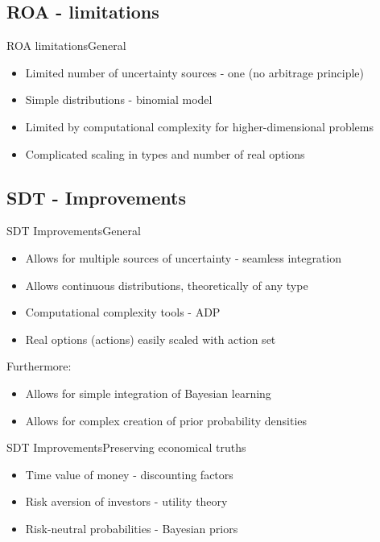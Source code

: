 \documentclass[us]{beamer}
\begin{document}
\subsection{ROA - limitations}

\begin{frame}{ROA limitations}{General}
	\begin{itemize}
		\item {Limited number of uncertainty sources - one (no arbitrage principle)}
		\item {Simple distributions - binomial model}
		\item {Limited by computational complexity for higher-dimensional problems}
		\item {Complicated scaling in types and number of real options}
	\end{itemize}
\end{frame}

\subsection{SDT - Improvements}

\begin{frame}{SDT Improvements}{General}
	\begin{itemize}
		\item {Allows for multiple sources of uncertainty - seamless integration}
		\item {Allows continuous distributions, theoretically of any type}
		\item {Computational complexity tools - ADP}
		\item {Real options (actions) easily scaled with action set}
	\end{itemize}

	Furthermore: 
	\begin{itemize}
		\item{Allows for simple integration of Bayesian learning}
		\item{Allows for complex creation of prior probability densities}
	\end{itemize}
\end{frame}

\begin{frame}{SDT Improvements}{Preserving economical truths}
	\begin{itemize}
		\item {Time value of money - discounting factors}
		\item {Risk aversion of investors - utility theory }
		\item {Risk-neutral probabilities - Bayesian priors}
	\end{itemize}
\end{frame}
\end{document}
